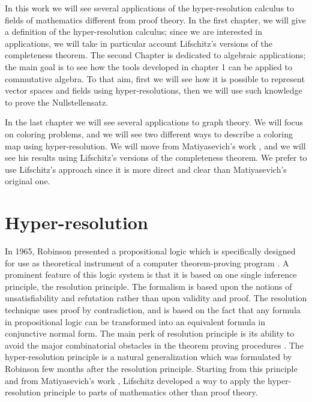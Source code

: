 \documentclass[a4paper,12pt,oneside]{book}
\begin{document}
In this work we will see several applications of the hyper-resolution calculus to fields of mathematics different from proof theory. 
In the first chapter, we will give a definition of the hyper-resolution calculus; since we are interested in applications, we will take in particular account Lifschitz's versions of the completeness theorem. The second Chapter is dedicated to algebraic applications; the main goal is to see how the tools developed in chapter 1 can be applied to commutative algebra. To that aim, first we will see how it is possible to represent vector spaces and fields using hyper-resolutions, then we will use such knowledge to prove the Nullstellensatz. 

In the last chapter we will see several applications to graph theory. We will focus on coloring problems, and we will see two different ways to describe a coloring map using hyper-resolution. We will move from 
Matiyasevich's work \cite{mat-2,mat-3,mat-1}, and we will see his results using Lifschitz's versions of the completeness theorem.  We prefer to use Lifschitz's approach since it is more direct and clear than Matiyasevich's original one. 



\chapter{Hyper-resolution}
In 1965, Robinson presented a propositional logic which is specifically designed for use as theoretical instrument of a computer theorem-proving program \cite{robinson}. A prominent feature of this logic system is that it is based on one single inference principle, the resolution principle. 
The formalism is based upon the notions of unsatisfiability and refutation rather than upon validity and proof. The resolution technique uses proof by contradiction, and is based on the fact that any formula in propositional logic can be transformed into an equivalent formula in conjunctive normal form. 
The main perk of resolution principle is its ability to avoid the major combinatorial obstacles in the theorem proving procedures  \cite{robinson}.
The hyper-resolution principle is a natural generalization which was formulated by Robinson \cite{rob,robinson-general} few months after the resolution principle. Starting from this principle and from Matiyasevich's work \cite{mat-1}, Lifschitz \cite{lifschitz} developed a way to apply the hyper-resolution principle to parts of mathematics other than proof theory.

\newpage
\end{document}
